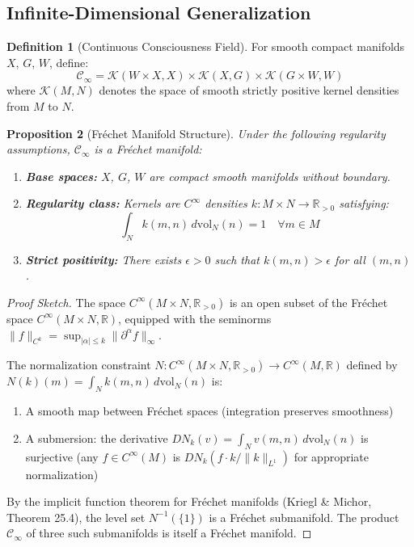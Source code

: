 \documentclass[11pt,a4paper]{article}
\theoremstyle{definition}
\newtheorem{definition}{Definition}[section]
\theoremstyle{plain}
\newtheorem{proposition}[definition]{Proposition}
\theoremstyle{remark}
\begin{document}
\subsection{Infinite-Dimensional Generalization}

\begin{definition}[Continuous Consciousness Field]
For smooth compact manifolds $X$, $G$, $W$, define:
\[
\mathcal{C}_\infty = \mathcal{K}(W \times X, X) \times \mathcal{K}(X, G) \times \mathcal{K}(G \times W, W)
\]
where $\mathcal{K}(M, N)$ denotes the space of smooth strictly positive kernel densities from $M$ to $N$.
\end{definition}

\begin{proposition}[Fr\'echet Manifold Structure]\label{prop:frechet-structure}
Under the following regularity assumptions, $\mathcal{C}_\infty$ is a Fr\'echet manifold:
\begin{enumerate}[label=(\roman*)]
    \item \textbf{Base spaces:} $X$, $G$, $W$ are compact smooth manifolds without boundary.
    \item \textbf{Regularity class:} Kernels are $C^\infty$ densities $k: M \times N \to \mathbb{R}_{>0}$ satisfying:
    \[
    \int_N k(m, n) \, d\text{vol}_N(n) = 1 \quad \forall m \in M
    \]
    \item \textbf{Strict positivity:} There exists $\epsilon > 0$ such that $k(m, n) > \epsilon$ for all $(m, n)$.
\end{enumerate}
\end{proposition}

\begin{proof}[Proof Sketch]
The space $C^\infty(M \times N, \mathbb{R}_{>0})$ is an open subset of the Fr\'echet space $C^\infty(M \times N, \mathbb{R})$, equipped with the seminorms $\|f\|_{C^k} = \sup_{|\alpha| \leq k} \|\partial^\alpha f\|_\infty$.

The normalization constraint $N: C^\infty(M \times N, \mathbb{R}_{>0}) \to C^\infty(M, \mathbb{R})$ defined by $N(k)(m) = \int_N k(m, n) \, d\text{vol}_N(n)$ is:
\begin{enumerate}
    \item A smooth map between Fr\'echet spaces (integration preserves smoothness)
    \item A submersion: the derivative $DN_k(v) = \int_N v(m, n) \, d\text{vol}_N(n)$ is surjective (any $f \in C^\infty(M)$ is $DN_k(f \cdot k / \|k\|_{L^1})$ for appropriate normalization)
\end{enumerate}

By the implicit function theorem for Fr\'echet manifolds (Kriegl \& Michor, Theorem 25.4), the level set $N^{-1}(\{1\})$ is a Fr\'echet submanifold. The product $\mathcal{C}_\infty$ of three such submanifolds is itself a Fr\'echet manifold.
\end{proof}
\end{document}
